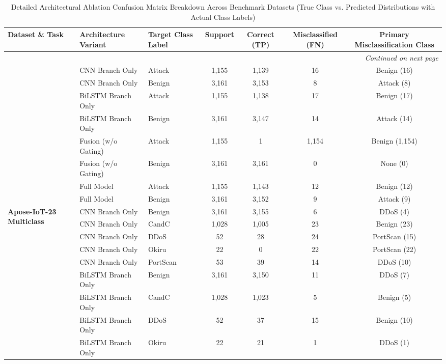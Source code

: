 \documentclass[a4paper,fleqn]{cas-sc}
\begin{document}
\begin{landscape}
\footnotesize
\begin{longtable}{lllcccc}
\caption{Detailed Architectural Ablation Confusion Matrix Breakdown Across Benchmark Datasets (True Class vs. Predicted Distributions with Actual Class Labels)} \label{tab:supp_arch_confusion_matrices} \\
\toprule
\textbf{Dataset \& Task} & \textbf{Architecture Variant} & \textbf{Target Class Label} & \textbf{Support} & \textbf{Correct (TP)} & \textbf{Misclassified (FN)} & \textbf{Primary Misclassification Class} \\
\midrule
\endhead
\midrule
\multicolumn{7}{r}{\textit{Continued on next page}} \\
\bottomrule
\endfoot
\bottomrule
\endlastfoot
\multirow{8}{*}{\textbf{Apose-IoT-23 Binary}} & CNN Branch Only & Attack & 1,155 & 1,139 & 16 & Benign (16) \\
 & CNN Branch Only & Benign & 3,161 & 3,153 & 8 & Attack (8) \\
 & BiLSTM Branch Only & Attack & 1,155 & 1,138 & 17 & Benign (17) \\
 & BiLSTM Branch Only & Benign & 3,161 & 3,147 & 14 & Attack (14) \\
 & Fusion (w/o Gating) & Attack & 1,155 & 1 & 1,154 & Benign (1,154) \\
 & Fusion (w/o Gating) & Benign & 3,161 & 3,161 & 0 & None (0) \\
 & Full Model & Attack & 1,155 & 1,143 & 12 & Benign (12) \\
 & Full Model & Benign & 3,161 & 3,152 & 9 & Attack (9) \\
\midrule
\multirow{20}{*}{\textbf{Apose-IoT-23 Multiclass}} & CNN Branch Only & Benign & 3,161 & 3,155 & 6 & DDoS (4) \\
 & CNN Branch Only & CandC & 1,028 & 1,005 & 23 & Benign (23) \\
 & CNN Branch Only & DDoS & 52 & 28 & 24 & PortScan (15) \\
 & CNN Branch Only & Okiru & 22 & 0 & 22 & PortScan (22) \\
 & CNN Branch Only & PortScan & 53 & 39 & 14 & DDoS (10) \\
 & BiLSTM Branch Only & Benign & 3,161 & 3,150 & 11 & DDoS (7) \\
 & BiLSTM Branch Only & CandC & 1,028 & 1,023 & 5 & Benign (5) \\
 & BiLSTM Branch Only & DDoS & 52 & 37 & 15 & Benign (10) \\
 & BiLSTM Branch Only & Okiru & 22 & 21 & 1 & DDoS (1) \\

\end{longtable}
\end{landscape}
\end{document}
